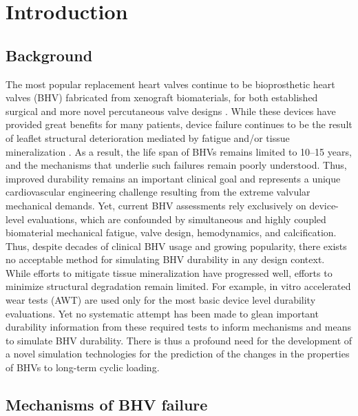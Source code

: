 \section{Introduction}

\subsection{Background}
    The most popular replacement heart valves continue to be bioprosthetic heart valves (BHV) fabricated from xenograft biomaterials, for both established surgical and more novel percutaneous valve designs \cite{schoen_evolving_2008,schoen_new_2006,schoen_cardiac_2005,schoen_calcification_2005,schoen_pathology_2001}. While these devices have provided great benefits for many patients, device failure continues to be the result of leaflet structural deterioration mediated by fatigue and/or tissue mineralization \cite{vesely_tissue_2001,sacks_collagen_2002}. As a result, the life span of BHVs remains limited to 10–15 years, and the mechanisms that underlie such failures remain poorly understood. Thus, improved durability remains an important clinical goal and represents a unique cardiovascular engineering challenge resulting from the extreme valvular mechanical demands. Yet, current BHV assessments rely exclusively on device-level evaluations, which are confounded by simultaneous and highly coupled biomaterial mechanical fatigue, valve design, hemodynamics, and calcification. Thus, despite decades of clinical BHV usage and growing popularity, there exists no acceptable method for simulating BHV durability in any design context. While efforts to mitigate tissue mineralization have progressed well, efforts to minimize structural degradation remain limited. For example, in vitro accelerated wear tests (AWT) are used only for the most basic device level durability evaluations. Yet no systematic attempt has been made to glean important durability information from these required tests to inform mechanisms and means to simulate BHV durability. There is thus a profound need for the development of a novel simulation technologies for the prediction of the changes in the properties of BHVs to long-term cyclic loading.
    
    
\subsection{Mechanisms of BHV failure}


